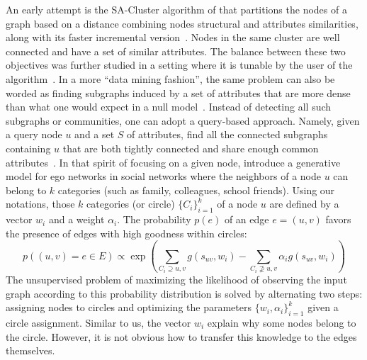 An early attempt is the \textsf{SA-Cluster} algorithm of \textcite{Zhou2009} that partitions the
nodes of a graph based on a distance combining nodes structural and attributes similarities, along
with its faster incremental version~\autocite{Zhou2010}. Nodes in the same cluster are well
connected and have a set of similar attributes. The balance between these two objectives was further
studied in a setting where it is tunable by the user of the algorithm~\textcite{Baroni2017}. In a
more \enquote{data mining fashion}, the same problem can also be worded as finding subgraphs induced
by a set of attributes that are more dense than what one would expect in a null
model~\autocite{Silva2012}. Instead of detecting all such subgraphs or communities, one can adopt a
query-based approach. Namely, given a query node $u$ and a set $S$ of attributes, find all the
connected subgraphs containing $u$ that are both tightly connected and share enough common
attributes~\autocite{AttributedCommunity16}. In that spirit of focusing on a given node,
\textcite{LeskovecEgo12} introduce a generative model for ego networks in social networks where the
neighbors of a node $u$ can belong to $k$ categories (such as family, colleagues, school friends).
Using our notations, those $k$ categories (or circle) $\{C_i\}_{i=1}^k$ of a node $u$ are defined by
a vector $w_i$ and a weight $\alpha_i$. The probability $p(e)$ of an edge $e=(u,v)$ favors the
presence of edges with high goodness within circles:
\begin{equation}
  \label{eq:edge_ego}
  p((u, v)=e \in E) \propto \exp \left(
    \sum_{C_i  \supseteq {u,v}} g(s_{uv}, w_i) -
    \sum_{C_i \nsupseteq {u,v}} \alpha_i g(s_{uv}, w_i)
  \right)%
\end{equation}
The unsupervised problem of maximizing the likelihood of observing the input graph according to this
probability distribution is solved by alternating two steps: assigning nodes to circles and
optimizing the parameters $\{w_i, \alpha_i\}_{i=1}^k$ given a circle assignment. Similar to us, the
vector $w_i$ explain why some nodes belong to the \ith{} circle. However, it is not obvious how to
transfer this knowledge to the edges themselves.

